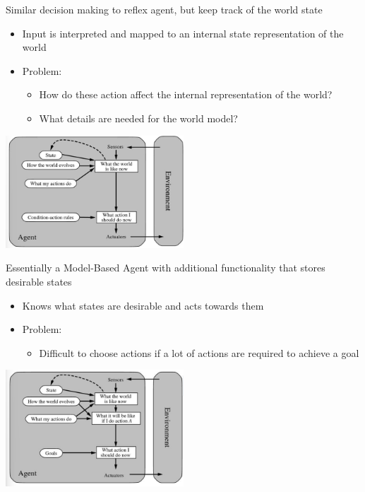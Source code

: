 \documentclass[
../../EiKI_Summary.tex,
]
{subfiles}
\begin{document}
\begin{defbox}
    Similar decision making to reflex agent, but keep track of the world state 
    \begin{itemize}
        \item Input is interpreted and mapped to an internal state representation of the world
        \item Problem: 
        \begin{itemize}
            \item How do these action affect the internal representation of the world?
            \item What details are needed for the world model?
        \end{itemize}
    \end{itemize}

    \begin{center}
        \includegraphics[width=0.5\textwidth]{Pics/2/ModelBasedAgent.png}
    \end{center}
\end{defbox}

\begin{defbox}
    Essentially a Model-Based Agent with additional functionality that stores desirable states
    \begin{itemize}
        \item Knows what states are desirable and acts towards them
        \item Problem:
        \begin{itemize}
            \item Difficult to choose actions if a lot of actions are required to achieve a goal
        \end{itemize}
    \end{itemize}

    \begin{center}
        \includegraphics[width=0.5\textwidth]{Pics/2/GoalBasedAgent.png}
    \end{center}
\end{defbox}
\end{document}
